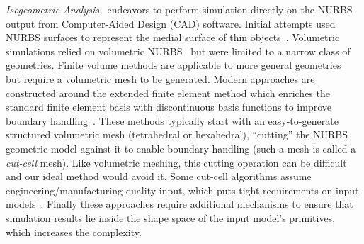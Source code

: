 \emph{Isogeometric Analysis}~\cite{10.1002/9780470749081.ch7} endeavors to perform simulation directly on the NURBS output from 
Computer-Aided Design (CAD) software. Initial attempts used NURBS surfaces to represent the medial surface of thin objects~\cite{10.1145/176579.176580}.
Volumetric simulations relied on volumetric NURBS~\cite{10.1007/978-3-642-03596-8_2} but were limited to a narrow class of geometries.
Finite volume methods are applicable to more general geometries~\cite{HEINRICH20121645,10.1002/nme.2311} but require a volumetric mesh to be generated.
Modern approaches are constructed around the extended finite element method which enriches the standard finite element basis with discontinuous basis functions
to improve boundary handling~\cite{https://doi.org/10.1002/nme.3120,10.1007/s00466-013-0854-7,https://doi.org/10.1002/nme.4852,SAFDARI2016373,10.1145/3355089.3356576}. 
These methods typically start with an easy-to-generate structured volumetric mesh (tetrahedral or hexahedral), ``cutting'' the NURBS geometric model against
it to enable boundary handling (such a mesh is called a \emph{cut-cell} mesh). 
Like volumetric meshing, this cutting operation can be difficult and our ideal method would avoid it. 
Some cut-cell algorithms assume engineering/manufacturing quality input, which puts tight requirements on input models~\cite{10.1145/3355089.3356576}.
Finally these approaches require additional mechanisms to ensure that simulation results lie inside the shape space of the input model's primitives,
which increases the complexity. 


